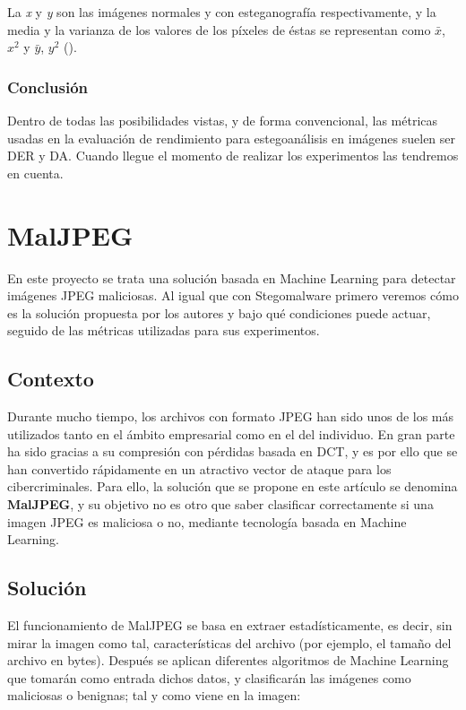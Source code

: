La \textit{x} y \textit{y} son las imágenes normales y con esteganografía respectivamente, y la media y la varianza de los valores de los píxeles de éstas se representan como \textit{$\bar{x}$}, \textit{$x^{2}$} y \textit{$\bar{y}$}, \textit{$y^{2}$} (\cite{qi}).%

\subsubsection{Conclusión}

Dentro de todas las posibilidades vistas, y de forma convencional, las métricas usadas en la evaluación de rendimiento para estegoanálisis en imágenes suelen ser \ac{DER} y \ac{DA}. Cuando llegue el momento de realizar los experimentos las tendremos en cuenta.

\section{MalJPEG}
\label{sec:maljpeg}

En este proyecto se trata una solución basada en Machine Learning para detectar imágenes JPEG maliciosas. Al igual que con Stegomalware primero veremos cómo es la solución propuesta por los autores y bajo qué condiciones puede actuar, seguido de las métricas utilizadas para sus experimentos.

\subsection{Contexto}

Durante mucho tiempo, los archivos con formato JPEG han sido unos de los más utilizados tanto en el ámbito empresarial como en el del individuo. En gran parte ha sido gracias a su compresión con pérdidas basada en \ac{DCT}, y es por ello que se han convertido rápidamente en un atractivo vector de ataque para los cibercriminales. Para ello, la solución que se propone en este artículo se denomina \textbf{MalJPEG}, y su objetivo no es otro que saber clasificar correctamente si una imagen JPEG es maliciosa o no, mediante tecnología basada en Machine Learning.

\subsection{Solución}

El funcionamiento de MalJPEG se basa en extraer estadísticamente, es decir, sin mirar la imagen como tal, características del archivo (por ejemplo, el tamaño del archivo en bytes). Después se aplican diferentes algoritmos de Machine Learning que tomarán como entrada dichos datos, y clasificarán las imágenes como maliciosas o benignas; tal y como viene en la imagen:

